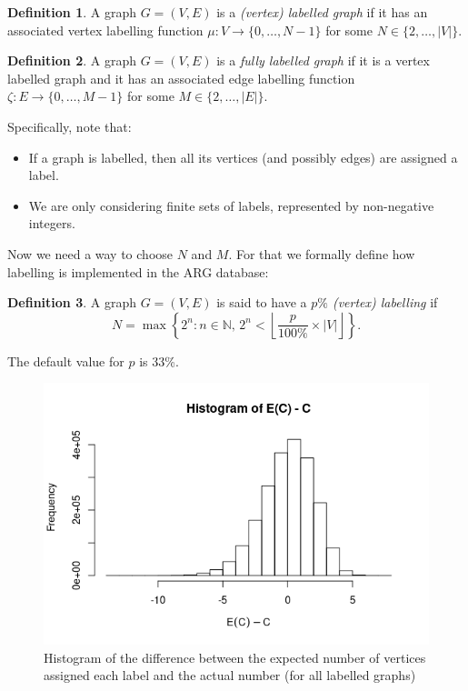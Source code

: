 \documentclass{article}
\theoremstyle{definition}
\newtheorem{definition}{Definition}[section]
\theoremstyle{remark}
\begin{document}
\begin{definition}
  A graph $G = (V, E)$ is a \emph{(vertex) labelled graph} if it has an associated
  vertex labelling function $\mu \colon V \to \{ 0, \dots, N - 1 \}$ for some $N
  \in \{2, \dots, |V| \}$.
\end{definition}

\begin{definition}
  A graph $G = (V, E)$ is a \emph{fully labelled graph} if it is a vertex labelled
  graph and it has an associated edge labelling function $\zeta \colon E \to
  \{ 0, \dots, M - 1 \}$ for some $M \in \{ 2, \dots, |E| \}$.
\end{definition}

Specifically, note that:

\begin{itemize}
\item If a graph is labelled, then all its vertices (and possibly edges) are
  assigned a label.
\item We are only considering finite sets of labels, represented by non-negative integers.
\end{itemize}

Now we need a way to choose $N$ and $M$. For that we formally define how
labelling is implemented in the ARG database:

\begin{definition}
  A graph $G = (V, E)$ is said to have a \emph{$p\%$ (vertex) labelling} if
  \[ N = \max \left\{ 2^n : n \in \mathbb{N},\, 2^n < \left\lfloor \frac{p}{100\%}
        \times |V| \right\rfloor \right\}. \]
\end{definition}

The default value for $p$ is 33\%.

\begin{figure} %
  \includegraphics[scale=0.5]{labelling_histogram.png}
  \caption{Histogram of the difference between the expected number of vertices
    assigned each label and the actual number (for all labelled graphs)}
  \label{figure:labelling_histogram}
\end{figure}
\end{document}
